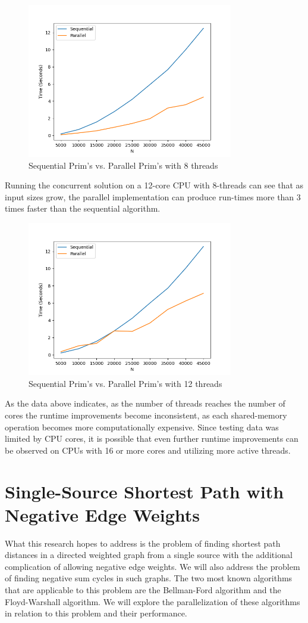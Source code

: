 \documentclass[conference]{IEEEtran}
\begin{document}
\begin{figure}[h]
    \includegraphics[width=9cm]{report/images/benchprim8.png}
    \caption{Sequential Prim's vs. Parallel Prim's with 8 threads}
    \label{fig:prim_8_comparison}
\end{figure}
Running the concurrent solution on a 12-core CPU with 8-threads can see that as input sizes grow, the parallel implementation can produce run-times more than 3 times faster than the sequential algorithm.
\begin{figure}[h]
    \includegraphics[width=9cm]{report/images/benchprim12.png}
    \caption{Sequential Prim's vs. Parallel Prim's with 12 threads}
    \label{fig:prim_8_comparison}
\end{figure}
As the data above indicates, as the number of threads reaches the number of cores the runtime improvements become inconsistent, as each shared-memory operation becomes more computationally expensive. Since testing data was limited by CPU cores, it is possible that even further runtime improvements can be observed on CPUs with 16 or more cores and utilizing more active threads.


\section{Single-Source Shortest Path with Negative Edge Weights}
What this research hopes to address is the problem of finding shortest path distances in a directed weighted graph from a single source with the additional complication of allowing negative edge weights. We will also address the problem of finding negative sum cycles in such graphs. The two most known algorithms that are applicable to this problem are the Bellman-Ford algorithm and the Floyd-Warshall algorithm. We will explore the parallelization of these algorithms in relation to this problem and their performance.
\end{document}
